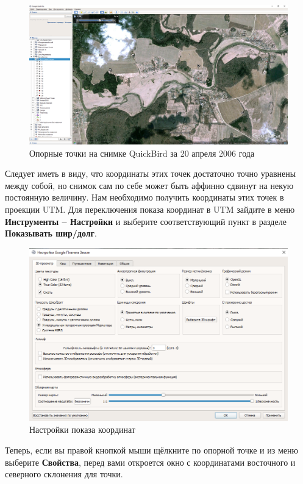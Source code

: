 \documentclass[
  12pt,
]{book}
\begin{document}
\begin{figure}
\centering
\includegraphics{images/Ref13/QB2006.png}
\caption{Опорные точки на снимке QuickBird за 20 апреля 2006 года}
\end{figure}

Следует иметь в виду, что координаты этих точек достаточно точно уравнены между собой, но снимок сам по себе может быть аффинно сдвинут на некую постоянную величину. Нам необходимо получить координаты этих точек в проекции UTM. Для переключения показа координат в UTM зайдите в меню \textbf{Инструменты -- Настройки} и выберите соответствующий пункт в разделе \textbf{Показывать шир/долг}.

\begin{figure}
\centering
\includegraphics{images/Ref13/GE_Settings.png}
\caption{Настройки показа координат}
\end{figure}

Теперь, если вы правой кнопкой мыши щёлкните по опорной точке и из меню выберите \textbf{Свойства}, перед вами откроется окно с координатами восточного и северного склонения для точки.
\end{document}
